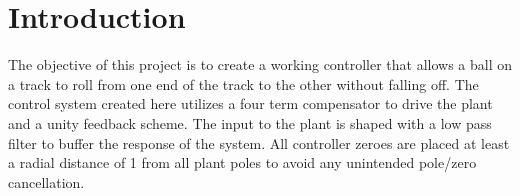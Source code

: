 \section{Introduction}

The objective of this project is to create a working controller that allows a ball on a track to roll from one end of the track to the other without falling off. The control system created here utilizes a four term compensator to drive the plant and a unity feedback scheme. The input to the plant is shaped with a low pass filter to buffer the response of the system. All controller zeroes are placed at least a radial distance of 1 from all plant poles to avoid any unintended pole/zero cancellation.
